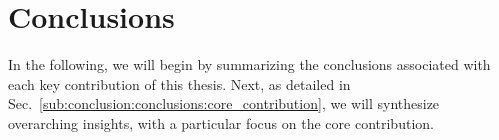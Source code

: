 \section{Conclusions}\label{sec:conclusion:conclusions}

In the following, we will begin by summarizing the conclusions associated with each key contribution of this thesis. Next, as detailed in Sec.~\ref{sub:conclusion:conclusions:core_contribution}, we will synthesize overarching insights, with a particular focus on the core contribution.

